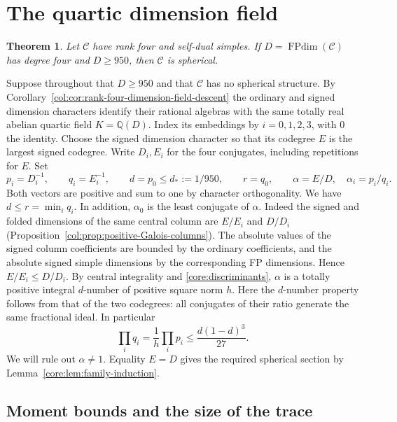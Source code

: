 \documentclass[11pt,a4paper]{article}
\newtheorem{theorem}{Theorem}[section]
\theoremstyle{definition}\newtheorem{definition}[theorem]{Definition}
\theoremstyle{remark}\newtheorem{remark}[theorem]{Remark}
\DeclareMathOperator{\FPdim}{FPdim}
\newcommand{\C}{\mathcal C}
\newcommand{\Q}{\mathbb Q}
\numberwithin{equation}{section}
\begin{document}
\section{The quartic dimension field}\label{sec:quartic-bound}

\begin{theorem}\label{thm:quartic-uniform-bound}
Let $\C$ have rank four and self-dual simples. If
$D=\FPdim(\C)$ has degree four and $D\ge950$, then $\C$ is spherical.
\end{theorem}

Suppose throughout that $D\ge950$ and that $\C$ has no spherical
structure. By Corollary~\ref{col:cor:rank-four-dimension-field-descent}
the ordinary and signed dimension characters identify their rational
algebras with the same totally real abelian quartic field $K=\Q(D)$.
Index its embeddings by $i=0,1,2,3$, with $0$ the identity.
Choose the signed dimension character so that its codegree $E$ is the
largest signed codegree. Write $D_i,E_i$ for the four conjugates,
including repetitions for $E$. Set
\[
 p_i=D_i^{-1},\qquad q_i=E_i^{-1},\qquad
 d=p_0\le d_*:=1/950,\qquad r=q_0,\qquad
 \alpha=E/D,\quad \alpha_i=p_i/q_i .
\]
Both vectors are positive and sum to one by character orthogonality.
We have $d\le r=\min_i q_i$. In addition, $\alpha_0$ is the least
conjugate of $\alpha$. Indeed the signed and folded dimensions of the
same central column are $E/E_i$ and $D/D_i$
(Proposition~\ref{col:prop:positive-Galois-columns}). The absolute
values of the signed column coefficients are bounded by the ordinary
coefficients, and the absolute signed simple dimensions by the corresponding
FP dimensions. Hence $E/E_i\le D/D_i$. By central integrality and
\eqref{core:discriminants}, $\alpha$ is a totally positive integral
$d$-number of positive square norm $h$. Here the $d$-number property
follows from that of the two codegrees: all conjugates of their ratio
generate the same fractional ideal. In particular
\begin{equation}\label{eq:quartic-products}
 \prod_i q_i=\frac1h\prod_i p_i
 \le \frac{d(1-d)^3}{27}.
\end{equation}
We will rule out $\alpha\ne1$. Equality $E=D$ gives the required
spherical section by Lemma~\ref{core:lem:family-induction}.

\subsection{Moment bounds and the size of the trace}
\end{document}
